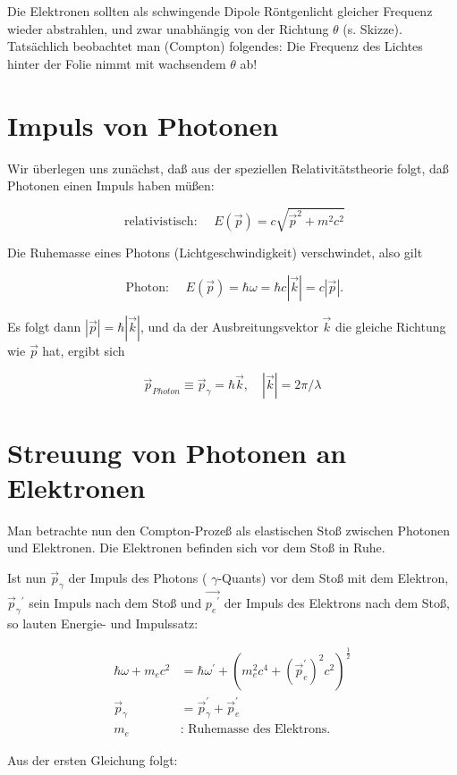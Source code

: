 \documentclass[10pt, letterpaper]{article}
\begin{document}
Die Elektronen sollten als schwingende Dipole Röntgenlicht gleicher Frequenz wieder abstrahlen, und zwar unabhängig von der Richtung $\theta$ (s. Skizze). Tatsächlich beobachtet man (Compton) folgendes: Die Frequenz des Lichtes hinter der Folie nimmt mit wachsendem $\theta$ ab!

\section*{Impuls von Photonen}
Wir überlegen uns zunächst, daß aus der speziellen Relativitätstheorie folgt, daß Photonen einen Impuls haben müßen:

$$
\text { relativistisch: } \quad E(\vec{p})=c \sqrt{\vec{p}^{2}+m^{2} c^{2}}
$$

Die Ruhemasse eines Photons (Lichtgeschwindigkeit) verschwindet, also gilt

$$
\text { Photon: } \quad E(\vec{p})=\hbar \omega=\hbar c|\vec{k}|=c|\vec{p}| .
$$

Es folgt dann $|\vec{p}|=\hbar|\vec{k}|$, und da der Ausbreitungsvektor $\vec{k}$ die gleiche Richtung wie $\vec{p}$ hat, ergibt sich

$$
\vec{p}_{P h o t o n} \equiv \vec{p}_{\gamma}=\hbar \vec{k}, \quad|\vec{k}|=2 \pi / \lambda
$$

\section*{Streuung von Photonen an Elektronen}
Man betrachte nun den Compton-Prozeß als elastischen Stoß zwischen Photonen und Elektronen. Die Elektronen befinden sich vor dem Stoß in Ruhe.

Ist nun $\vec{p}_{\gamma}$ der Impuls des Photons ( $\gamma$-Quants) vor dem Stoß mit dem Elektron, $\vec{p}_{\gamma}{ }^{\prime}$ sein Impuls nach dem Stoß und $\overrightarrow{p_{e}{ }^{\prime}}$ der Impuls des Elektrons nach dem Stoß, so lauten Energie- und Impulssatz:

$$
\begin{aligned}
\hbar \omega+m_{e} c^{2} & =\hbar \omega^{\prime}+\left(m_{e}^{2} c^{4}+\left(\vec{p}_{e}^{\prime}\right)^{2} c^{2}\right)^{\frac{1}{2}} \\
\vec{p}_{\gamma} & =\vec{p}_{\gamma}^{\prime}+\vec{p}_{e}^{\prime} \\
m_{e} & : \text { Ruhemasse des Elektrons. }
\end{aligned}
$$

Aus der ersten Gleichung folgt:
\end{document}

